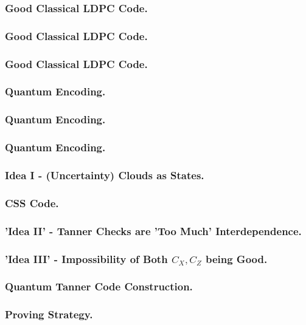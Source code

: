 \documentclass[usenames, aspectratio=169]{beamer}
\theoremstyle{claim}
\theoremstyle{remark}
\begin{document}


\begin{frame}
  \frametitle{Good Classical LDPC Code.}

\end{frame}
\begin{frame}
  \frametitle{Good Classical LDPC Code.}
\end{frame}

\begin{frame}
  \frametitle{Good Classical LDPC Code.}
\end{frame}




 \begin{frame}
   \frametitle{Quantum Encoding.}
\end{frame}
 \begin{frame}
   \frametitle{Quantum Encoding.}
\end{frame}
 \begin{frame}
   \frametitle{Quantum Encoding.}
\end{frame}

\begin{frame}
  \frametitle{ Idea I - (Uncertainty) Clouds as States. }
\end{frame}
\begin{frame}
  \frametitle{ CSS Code.  }
\end{frame}

\begin{frame}
  \frametitle{ 'Idea II' - Tanner Checks are 'Too Much' Interdependence.}
\end{frame}

\begin{frame}
  \frametitle{ 'Idea III' - Impossibility of Both $C_{X},C_{Z}$ being Good.}
\end{frame}

\begin{frame}
  \frametitle{ Quantum Tanner Code Construction.}
\end{frame}

\begin{frame}
  \frametitle{ Proving Strategy. }
\end{frame}

\end{document}
